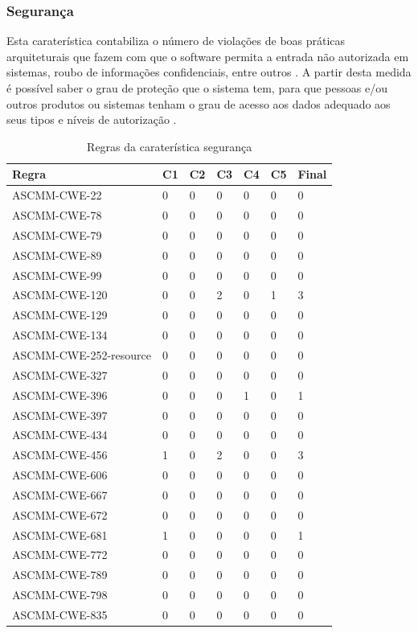 \documentclass[openany,10pt,a4paper]{article}
\begin{document}
\subsubsection{Segurança}
Esta caraterística contabiliza o número de violações de boas práticas arquiteturais que fazem com que o software permita a entrada não autorizada em sistemas, roubo de informações confidenciais, entre outros \cite{OMG_Security}. A partir desta medida é possível saber o grau de proteção que o sistema tem, para que pessoas e/ou outros produtos ou sistemas tenham o grau de acesso aos dados adequado aos seus tipos e níveis de autorização \cite{security_iso}.
\begin{samepage}
\begin{longtable}{|p{1.9in}|p{0.28in}|p{0.28in}|p{0.28in}|p{0.28in}|p{0.28in}|p{0.35in}|}
		\caption{Regras da caraterística segurança}
		\label{table_security}
		\endhead
		\hline	
		\textbf{Regra} & \textbf{C1} & \textbf{C2} & \textbf{C3} & \textbf{C4} & \textbf{C5} & \textbf{Final} \\ \hline
		ASCMM-CWE-22 & 0 & 0 & 0 & 0 & 0 & 0 \\ \hline
		ASCMM-CWE-78 & 0 & 0 & 0 & 0 & 0 & 0 \\ \hline
		ASCMM-CWE-79 & 0 & 0 & 0 & 0 & 0 & 0 \\ \hline
		ASCMM-CWE-89 & 0 & 0 & 0 & 0 & 0 & 0 \\ \hline
		ASCMM-CWE-99 & 0 & 0 & 0 & 0 & 0 & 0 \\ \hline
		ASCMM-CWE-120 & 0 & 0 & 2 & 0 & 1 & 3 \\ \hline
		ASCMM-CWE-129 & 0 & 0 & 0 & 0 & 0 & 0 \\ \hline
		ASCMM-CWE-134 & 0 & 0 & 0 & 0 & 0 & 0 \\ \hline
		ASCMM-CWE-252-resource & 0 & 0 & 0 & 0 & 0 & 0 \\ \hline
		ASCMM-CWE-327 & 0 & 0 & 0 & 0 & 0 & 0 \\ \hline
		ASCMM-CWE-396 & 0 & 0 & 0 & 1 & 0 & 1 \\ \hline
		ASCMM-CWE-397 & 0 & 0 & 0 & 0 & 0 & 0 \\ \hline
		ASCMM-CWE-434 & 0 & 0 & 0 & 0 & 0 & 0 \\ \hline
		ASCMM-CWE-456 & 1 & 0 & 2 & 0 & 0 & 3 \\ \hline
		ASCMM-CWE-606 & 0 & 0 & 0 & 0 & 0 & 0 \\ \hline
		ASCMM-CWE-667 & 0 & 0 & 0 & 0 & 0 & 0 \\ \hline
		ASCMM-CWE-672 & 0 & 0 & 0 & 0 & 0 & 0 \\ \hline
		ASCMM-CWE-681 & 1 & 0 & 0 & 0 & 0 & 1 \\ \hline
		ASCMM-CWE-772 & 0 & 0 & 0 & 0 & 0 & 0 \\ \hline
		ASCMM-CWE-789 & 0 & 0 & 0 & 0 & 0 & 0 \\ \hline
		ASCMM-CWE-798 & 0 & 0 & 0 & 0 & 0 & 0 \\ \hline
		ASCMM-CWE-835 & 0 & 0 & 0 & 0 & 0 & 0 \\ \hline
\end{longtable}
\end{samepage}
\end{document}
